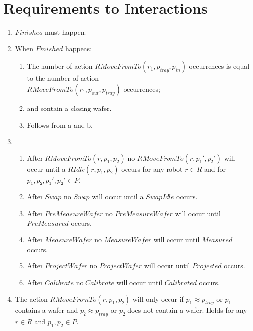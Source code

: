 \section{Requirements to Interactions}\label{sec:req2int}

\begin{enumerate}
    \item $\mathit{Finished}$ must happen.

    \item When $\mathit{Finished}$ happens:
    \begin{enumerate}
        \item The number of action $\mathit{RMoveFromTo}(r_1, p_\mathit{tray}, p_\mathit{in})$ occurrences is equal to the number of action \\$\mathit{RMoveFromTo}(r_1, p_\mathit{out}, p_\mathit{tray})$ occurrences;
        \item \chuckMeas and \chuckProj contain a closing wafer.
        \item Follows from a and b.
    \end{enumerate}

    \item \begin{enumerate}
        \item After $\mathit{RMoveFromTo}(r, p_1, p_2)$ no $\mathit{RMoveFromTo}(r, p_1', p_2')$ will occur until a $\mathit{RIdle}(r, p_1,p_2)$ occurs for any robot $r \in R$ and for $p_1, p_2, p_1',p_2' \in P$.
        \item After $\mathit{Swap}$ no $\mathit{Swap}$ will occur until a $\mathit{SwapIdle}$ occurs.
        \item After $\mathit{PreMeasureWafer}$ no $\mathit{PreMeasureWafer}$ will occur until $\mathit{PreMeasured}$ occurs.
        \item After $\mathit{MeasureWafer}$ no $\mathit{MeasureWafer}$ will occur until $\mathit{Measured}$ occurs.
        \item After $\mathit{ProjectWafer}$ no $\mathit{ProjectWafer}$ will occur until $\mathit{Projected}$ occurs.
        \item After $\mathit{Calibrate}$ no $\mathit{Calibrate}$ will occur until $\mathit{Calibrated}$ occurs.
    \end{enumerate}

    \item The action $RMoveFromTo(r, p_1, p_2)$ will only occur if $p_1 \approx p_\mathit{tray}$ or $p_1$ contains a wafer and $p_2 \approx p_\mathit{tray}$ or $p_2$ does not contain a wafer.
    Holds for any $r \in R$ and $p_1,p_2 \in P$.


\end{enumerate}
